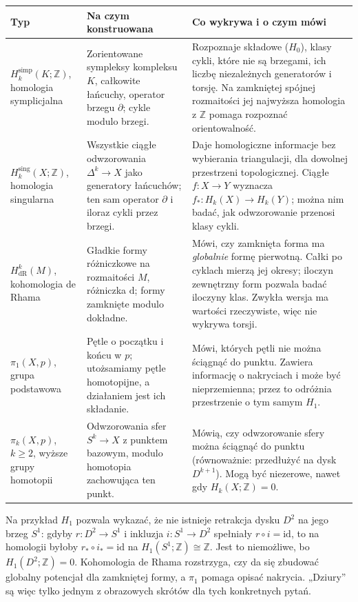 \documentclass[11pt,a4paper,oneside]{report}
\newcommand{\Z}{\mathbb{Z}}
\newcommand{\id}{\mathrm{id}}
\newcommand{\dd}{\mathrm d}
\theoremstyle{plain}
\theoremstyle{definition}
\theoremstyle{remark}
\begin{document}
\begin{center}
\small
\renewcommand{\arraystretch}{1.18}
\begin{tabular}{>{\raggedright\arraybackslash}p{3.05cm}
                >{\raggedright\arraybackslash}p{4.4cm}
                >{\raggedright\arraybackslash}p{6.75cm}}
\hline
\textbf{Typ}&\textbf{Na czym konstruowana}&
\textbf{Co wykrywa i o czym mówi}\\
\hline
$H_k^{\mathrm{simp}}(K;\Z)$,
homologia symplicjalna&
Zorientowane sympleksy kompleksu $K$,
całkowite łańcuchy, operator brzegu
$\partial$; cykle modulo brzegi.&
Rozpoznaje składowe ($H_0$), klasy cykli,
które nie są brzegami, ich liczbę niezależnych
generatorów i torsję. Na zamkniętej spójnej
rozmaitości jej najwyższa homologia z $\Z$
pomaga rozpoznać orientowalność.\\
\hline
$H_k^{\mathrm{sing}}(X;\Z)$,
homologia singularna&
Wszystkie ciągłe odwzorowania
$\Delta^k\to X$ jako generatory łańcuchów;
ten sam operator $\partial$ i iloraz
cykli przez brzegi.&
Daje homologiczne informacje bez wybierania
triangulacji, dla dowolnej przestrzeni
topologicznej. Ciągłe $f:X\to Y$ wyznacza
$f_*:H_k(X)\to H_k(Y)$; można nim badać,
jak odwzorowanie przenosi klasy cykli.\\
\hline
$H^k_{\mathrm{dR}}(M)$,
kohomologia de Rhama&
Gładkie formy różniczkowe na rozmaitości $M$,
różniczka $\dd$; formy zamknięte modulo dokładne.&
Mówi, czy zamknięta forma ma \emph{globalnie}
formę pierwotną. Całki po cyklach mierzą jej
okresy; iloczyn zewnętrzny form pozwala badać
iloczyny klas. Zwykła wersja ma wartości
rzeczywiste, więc nie wykrywa torsji.\\
\hline
$\pi_1(X,p)$,
grupa podstawowa&
Pętle o początku i końcu w $p$;
utożsamiamy pętle homotopijne, a działaniem
jest ich składanie.&
Mówi, których pętli nie można ściągnąć do
punktu. Zawiera informację o nakryciach
i może być nieprzemienna; przez to odróżnia
przestrzenie o tym samym $H_1$.\\
\hline
$\pi_k(X,p)$, $k\geq2$,
wyższe grupy homotopii&
Odwzorowania sfer $S^k\to X$ z punktem
bazowym, modulo homotopia zachowująca
ten punkt.&
Mówią, czy odwzorowanie sfery można
ściągnąć do punktu (równoważnie: przedłużyć
na dysk $D^{k+1}$). Mogą być niezerowe,
nawet gdy $H_k(X;\Z)=0$.\\
\hline
\end{tabular}
\end{center}

Na przykład $H_1$ pozwala wykazać, że
nie istnieje retrakcja dysku $D^2$ na jego
brzeg $S^1$: gdyby $r:D^2\to S^1$
i inkluzja $i:S^1\to D^2$ spełniały
$r\circ i=\id$, to na homologii byłoby
$r_*\circ i_*=\id$ na $H_1(S^1;\Z)\cong\Z$.
Jest to niemożliwe, bo $H_1(D^2;\Z)=0$.
Kohomologia de Rhama rozstrzyga, czy da się
zbudować globalny potencjał dla zamkniętej
formy, a $\pi_1$ pomaga opisać nakrycia.
„Dziury” są więc tylko jednym z obrazowych
skrótów dla tych konkretnych pytań.
\end{document}
